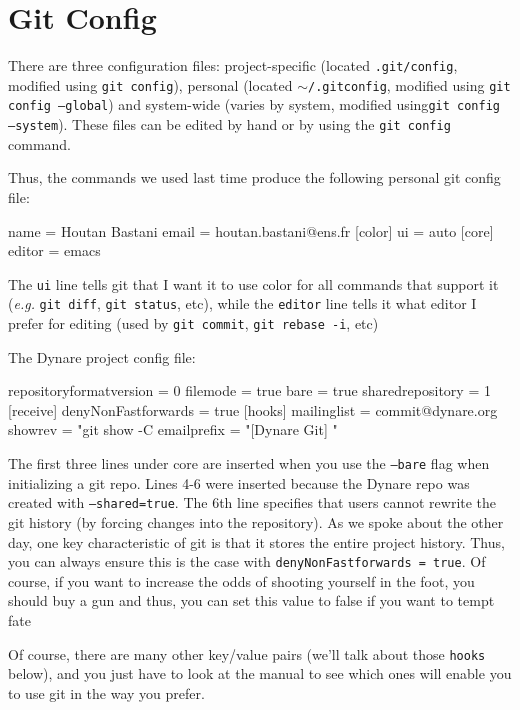 \documentclass[10pt,letterpaper]{article}
\begin{document}
\section{Git Config}
\label{config}

There are three configuration files: project-specific (located \texttt{.git/config}, modified using \texttt{git config}), personal (located \texttt{$\sim$/.gitconfig}, modified using \texttt{git config --global}) and system-wide (varies by system, modified using\texttt{git config --system}). These files can be edited by hand or by using the \texttt{git config} command.

Thus, the commands we used last time produce the following personal git config file:
\begin{code}
[user]
	name = Houtan Bastani
	email = houtan.bastani@ens.fr
[color]
	ui = auto
[core]
	editor = emacs
\end{code}
\noindent The \texttt{ui} line tells git that I want it to use color for all commands that support it (\textit{e.g.} \texttt{git diff}, \texttt{git status}, etc), while the \texttt{editor} line tells it what editor I prefer for editing (used by \texttt{git commit}, \texttt{git rebase -i}, etc)

The Dynare project config file:
\begin{code}
[core]
	repositoryformatversion = 0
	filemode = true
	bare = true
	sharedrepository = 1
[receive]
	denyNonFastforwards = true
[hooks]
	mailinglist = commit@dynare.org
	showrev = "git show -C %
	emailprefix = "[Dynare Git] "
\end{code}
\noindent The first three lines under core are inserted when you use the \texttt{--bare} flag when initializing a git repo. Lines 4-6 were inserted because the Dynare repo was created with \texttt{--shared=true}. The 6th line specifies that users cannot rewrite the git history (by forcing changes into the repository). As we spoke about the other day, one key characteristic of git is that it stores the entire project history. Thus, you can always ensure this is the case with \texttt{denyNonFastforwards = true}. Of course, if you want to increase the odds of shooting yourself in the foot, you should buy a gun and thus, you can set this value to false if you want to tempt fate \smiley

Of course, there are many other key/value pairs (we'll talk about those \texttt{hooks} below), and you just have to look at the manual to see which ones will enable you to use git in the way you prefer.
\end{document}
